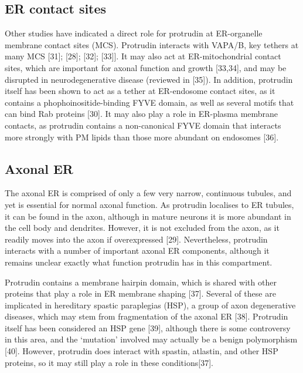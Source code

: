 \documentclass[
  12pt,
  a4paper,
]{book}
\begin{document}
\hypertarget{er-contact-sites}{%
\subsection{ER contact sites}\label{er-contact-sites}}

Other studies have indicated a direct role for protrudin at ER-organelle membrane contact sites (MCS). Protrudin interacts with VAPA/B, key tethers at many MCS {[}31{]}; {[}28{]}; {[}32{]}; {[}33{]}{]}. It may also act at ER-mitochondrial contact sites, which are important for axonal function and growth {[}33,34{]}, and may be disrupted in neurodegenerative disease (reviewed in {[}35{]}). In addition, protrudin itself has been shown to act as a tether at ER-endosome contact sites, as it contains a phophoinositide-binding FYVE domain, as well as several motifs that can bind Rab proteins {[}30{]}. It may also play a role in ER-plasma membrane contacts, as protrudin contains a non-canonical FYVE domain that interacts more strongly with PM lipids than those more abundant on endosomes {[}36{]}.

\hypertarget{intro-ptdn-axonalER}{%
\subsection{Axonal ER}\label{intro-ptdn-axonalER}}

The axonal ER is comprised of only a few very narrow, continuous tubules, and yet is essential for normal axonal function. As protrudin localises to ER tubules, it can be found in the axon, although in mature neurons it is more abundant in the cell body and dendrites. However, it is not excluded from the axon, as it readily moves into the axon if overexpressed {[}29{]}. Nevertheless, protrudin interacts with a number of important axonal ER components, although it remains unclear exactly what function protrudin has in this compartment.

Protrudin contains a membrane hairpin domain, which is shared with other proteins that play a role in ER membrane shaping {[}37{]}. Several of these are implicated in hereditary spastic paraplegias (HSP), a group of axon degenerative diseases, which may stem from fragmentation of the axonal ER {[}38{]}. Protrudin itself has been considered an HSP gene {[}39{]}, although there is some controversy in this area, and the `mutation' involved may actually be a benign polymorphism {[}40{]}. However, protrudin does interact with spastin, atlastin, and other HSP proteins, so it may still play a role in these conditions{[}37{]}.
\end{document}
